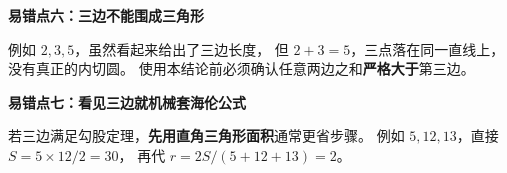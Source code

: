 \begin{trapbox}
\medskip
\textbf{\textcolor{CTrap}{易错点六：三边不能围成三角形}}

例如 $2,3,5$，虽然看起来给出了三边长度，
但 $2+3=5$，三点落在同一直线上，没有真正的内切圆。
使用本结论前必须确认任意两边之和\textbf{严格大于}第三边。

\medskip
\textbf{\textcolor{CTrap}{易错点七：看见三边就机械套海伦公式}}

若三边满足勾股定理，\textbf{先用直角三角形面积}通常更省步骤。
例如 $5,12,13$，直接 $S=5\times12/2=30$，
再代 $r=2S/(5+12+13)=2$。
\end{trapbox}
